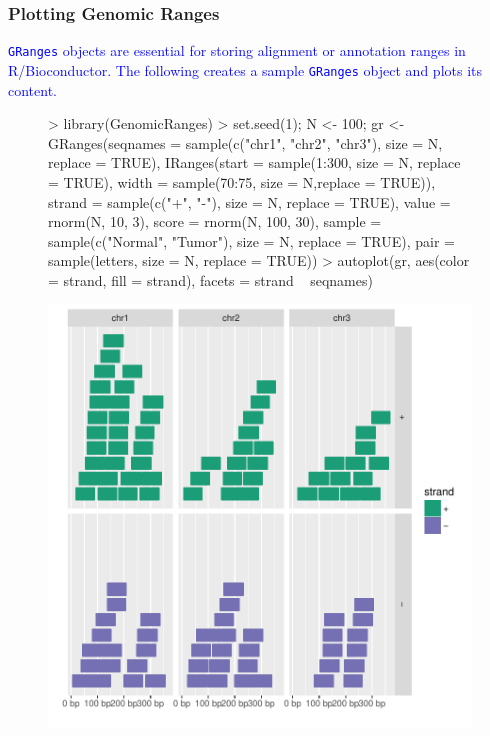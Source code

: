 \documentclass{beamer}
\newcommand{\Robject}[1]{{\texttt{#1}}}
\begin{document}
\begin{frame}[containsverbatim]  
	\frametitle{Plotting Genomic Ranges}
\scriptsize
\textcolor{blue}{\Robject{GRanges} objects are essential for storing alignment or annotation ranges in R/Bioconductor. The following creates a sample \Robject{GRanges} object and plots its content.}
\tiny 
\begin{figure}
  \centering
\begin{Schunk}
\begin{Sinput}
> library(GenomicRanges)
> set.seed(1); N <- 100; gr <- GRanges(seqnames = sample(c("chr1", "chr2", "chr3"), size = N, replace = TRUE), IRanges(start = sample(1:300, size = N, replace = TRUE), width = sample(70:75, size = N,replace = TRUE)), strand = sample(c("+", "-"), size = N, replace = TRUE), value = rnorm(N, 10, 3), score = rnorm(N, 100, 30), sample = sample(c("Normal", "Tumor"), size = N, replace = TRUE), pair = sample(letters, size = N, replace = TRUE))
> autoplot(gr, aes(color = strand, fill = strand), facets = strand ~ seqnames)
\end{Sinput}
\end{Schunk}
\includegraphics{fig--080}
\label{fig:tracks}
\end{figure}
\end{frame}
\end{document}
